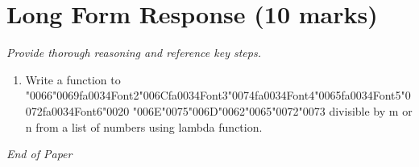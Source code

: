 \documentclass[12pt]{article}
\begin{document}
\section*{Long Form Response (10 marks)}
\textit{Provide thorough reasoning and reference key steps.}
\begin{enumerate}[label=\arabic*.]
\item Write a function to {\char"0066}{\char"0069}{\csname fa0034Font2\endcsname\char"006C}{\csname fa0034Font3\endcsname\char"0074}{\csname fa0034Font4\endcsname\char"0065}{\csname fa0034Font5\endcsname\char"0072}{\csname fa0034Font6\endcsname\char"0020} {\char"006E}{\char"0075}{\char"006D}{\char"0062}{\char"0065}{\char"0072}{\char"0073} divisible by m or n from a list of numbers using lambda
function.
\end{enumerate}

\vfill
\noindent\textit{End of Paper}
\end{document}
